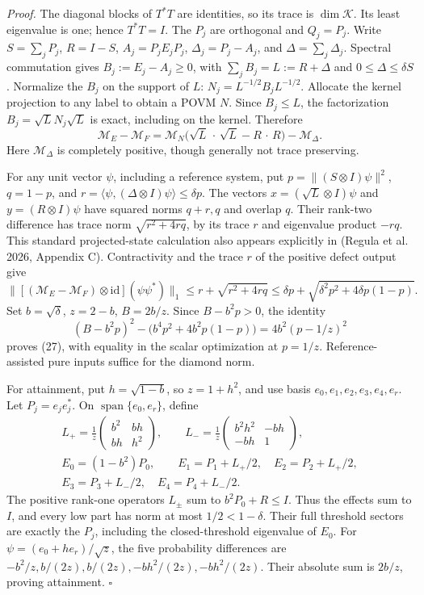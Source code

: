 \documentclass[
  11pt,
  a4paper,
]{article}
\begin{document}
\emph{Proof.} The diagonal blocks of \(T^*T\) are identities, so its
trace is \(\dim\mathcal K\). Its least eigenvalue is one; hence
\(T^*T=I\). The \(P_j\) are orthogonal and \(Q_j=P_j\). Write
\(S=\sum_jP_j\), \(R=I-S\), \(A_j=P_jE_jP_j\), \(\Delta_j=P_j-A_j\), and
\(\Delta=\sum_j\Delta_j\). Spectral commutation gives
\(B_j:=E_j-A_j\ge0\), with \(\sum_jB_j=L:=R+\Delta\) and
\(0\le\Delta\le\delta S\). Normalize the \(B_j\) on the support of
\(L\): \(N_j=L^{-1/2}B_jL^{-1/2}\). Allocate the kernel projection to
any label to obtain a POVM \(N\). Since \(B_j\le L\), the factorization
\(B_j=\sqrt L N_j\sqrt L\) is exact, including on the kernel. Therefore
\[\mathcal M_E-\mathcal M_F
=\mathcal M_N\bigl(\sqrt L\,\cdot\,\sqrt L-R\,\cdot\,R\bigr)
-\mathcal M_\Delta.
\tag{28}\] Here \(\mathcal M_\Delta\) is completely positive, though
generally not trace preserving.

For any unit vector \(\psi\), including a reference system, put
\(p=\|(S\otimes I)\psi\|^2\), \(q=1-p\), and
\(r=\langle\psi,(\Delta\otimes I)\psi\rangle\le\delta p\). The vectors
\(x=(\sqrt L\otimes I)\psi\) and \(y=(R\otimes I)\psi\) have squared
norms \(q+r,q\) and overlap \(q\). Their rank-two difference has trace
norm \(\sqrt{r^2+4rq}\), by its trace \(r\) and eigenvalue product
\(-rq\). This standard projected-state calculation also appears
explicitly in (Regula et al. 2026, Appendix C). Contractivity and the
trace \(r\) of the positive defect output give
\[\|[(\mathcal M_E-\mathcal M_F)\otimes\mathrm{id}](\psi\psi^*)\|_1
\le r+\sqrt{r^2+4rq}
\le\delta p+\sqrt{\delta^2p^2+4\delta p(1-p)}.
\tag{29}\] Set \(b=\sqrt\delta\), \(z=2-b\), \(B=2b/z\). Since
\(B-b^2p>0\), the identity \[(B-b^2p)^2-\bigl(b^4p^2+4b^2p(1-p)\bigr)
=4b^2(p-1/z)^2\] proves (27), with equality in the scalar optimization
at \(p=1/z\). Reference-assisted pure inputs suffice for the diamond
norm.

For attainment, put \(h=\sqrt{1-b}\), so \(z=1+h^2\), and use basis
\(e_0,e_1,e_2,e_3,e_4,e_r\). Let \(P_j=e_je_j^*\). On
\(\operatorname{span}\{e_0,e_r\}\), define \[\begin{gathered}
L_+=\frac1z\begin{pmatrix}b^2&bh\\bh&h^2\end{pmatrix},\qquad
L_-=\frac1z\begin{pmatrix}b^2h^2&-bh\\-bh&1\end{pmatrix},\\
E_0=(1-b^2)P_0,\qquad
E_1=P_1+L_+/2,\quad E_2=P_2+L_+/2,\\
E_3=P_3+L_-/2,\quad E_4=P_4+L_-/2.
\end{gathered}
\tag{30}\] The positive rank-one operators \(L_\pm\) sum to
\(b^2P_0+R\le I\). Thus the effects sum to \(I\), and every low part has
norm at most \(1/2<1-\delta\). Their full threshold sectors are exactly
the \(P_j\), including the closed-threshold eigenvalue of \(E_0\). For
\(\psi=(e_0+he_r)/\sqrt z\), the five probability differences are
\(-b^2/z,b/(2z),b/(2z),-bh^2/(2z),-bh^2/(2z)\). Their absolute sum is
\(2b/z\), proving attainment. \(\square\)
\end{document}
